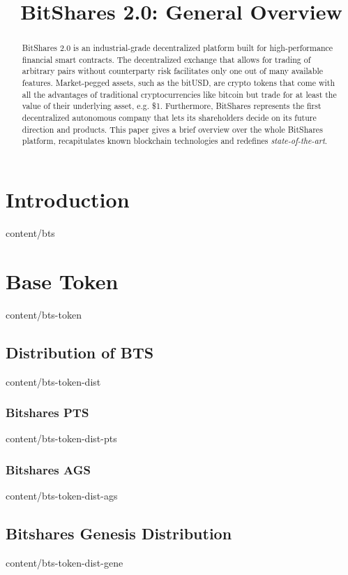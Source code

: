 \documentclass{btswhitepaper}
\title{BitShares 2.0: General Overview}
\begin{document}
\maketitle

\begin{abstract}%
 BitShares 2.0 is an industrial-grade decentralized platform built for
 high-performance financial smart contracts. The decentralized exchange that
 allows for trading of arbitrary pairs without counterparty risk facilitates
 only one out of many available features. Market-pegged assets, such as the
 bitUSD, are crypto tokens that come with all the advantages of traditional
 cryptocurrencies like bitcoin but trade for at least the value of their
 underlying asset, e.g. \$1. Furthermore, BitShares represents the first
 decentralized autonomous company that lets its shareholders decide on its
 future direction and products. This paper gives a brief overview over the
 whole BitShares platform, recapitulates known blockchain technologies and
 redefines \emph{state-of-the-art}.
\end{abstract}

\section       { Introduction                      }  { content/bts                 } 

\section       { Base Token                        }  { content/bts-token           } 
\subsection    { Distribution of BTS               }  { content/bts-token-dist      } 
\subsubsection { Bitshares PTS                     }  { content/bts-token-dist-pts  } 
\subsubsection { Bitshares AGS                     }  { content/bts-token-dist-ags  } 
\subsection    { Bitshares Genesis Distribution    }  { content/bts-token-dist-gene } 
\end{document}
